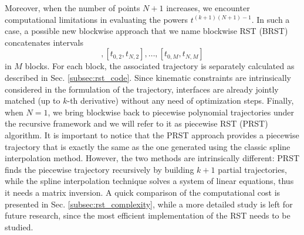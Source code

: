 Moreover, when the number of points $N+1$ increases, we encounter computational limitations in evaluating the powers $t^{(k+1)(N+1)-1}$. In such a case, a possible new blockwise approach that we name blockwise RST (BRST) concatenates intervals 
\begin{equation}
    [t_{0,1},t_{N,1}], [t_{0,2},t_{N,2}], \dots, [t_{0,M},t_{N,M}]
\end{equation} 
in $M$ blocks. For each block, the associated trajectory is separately calculated as described in Sec. \ref{subsec:rst_code}. Since kinematic constraints are intrinsically considered in the formulation of the trajectory, interfaces are already jointly matched (up to $k$-th derivative) without any need of optimization steps. Finally, when $N=1$, we bring blockwise back to piecewise polynomial trajectories under the recursive framework and we will refer to it as piecewise RST (PRST) algorithm. It is important to notice that the PRST approach provides a piecewise trajectory that is exactly the same as the one generated using the classic spline interpolation method. However, the two methods are intrinsically different: PRST finds the piecewise trajectory recursively by building $k+1$ partial trajectories, while the spline interpolation technique solves a system of linear equations, thus it needs a matrix inversion. A quick comparison of the computational cost is presented in Sec. \ref{subsec:rst_complexity}, while a more detailed study is left for future research, since the most efficient implementation of the RST needs to be studied.